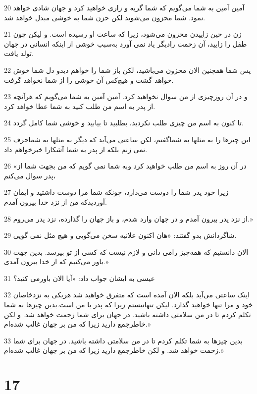 \par 20 آمین آمین به شما می‌گویم که شما گریه و زاری خواهید کرد و جهان شادی خواهد نمود. شما محزون می‌شوید لکن حزن شما به خوشی مبدل خواهد شد.
\par 21 زن در حین زاییدن محزون می‌شود، زیرا که ساعت او رسیده است. و لیکن چون طفل را زایید، آن زحمت رادیگر یاد نمی آورد به‌سبب خوشی از اینکه انسانی در جهان تولد یافت.
\par 22 پس شما همچنین الان محزون می‌باشید، لکن باز شما را خواهم دیدو دل شما خوش خواهد گشت و هیچ‌کس آن خوشی را از شما نخواهد گرفت.
\par 23 و در آن روزچیزی از من سوال نخواهید کرد. آمین آمین به شما می‌گویم که هر‌آنچه از پدر به اسم من طلب کنید به شما عطا خواهد کرد.
\par 24 تا کنون به اسم من چیزی طلب نکردید، بطلبید تا بیابید و خوشی شما کامل گردد.
\par 25 این چیزها را به مثلها به شماگفتم، لکن ساعتی می‌آید که دیگر به مثلها به شماحرف نمی زنم بلکه از پدر به شما آشکارا خبرخواهم داد.
\par 26 «در آن روز به اسم من طلب خواهید کرد وبه شما نمی گویم که من بجهت شما از پدر سوال می‌کنم،
\par 27 زیرا خود پدر شما را دوست می‌دارد، چونکه شما مرا دوست داشتید و ایمان آوردیدکه من از نزد خدا بیرون آمدم.
\par 28 از نزد پدر بیرون آمدم و در جهان وارد شدم، و باز جهان را گذارده، نزد پدر می‌روم.»
\par 29 شاگردانش بدو گفتند: «هان اکنون علانیه سخن می‌گویی و هیچ مثل نمی گویی.
\par 30 الان دانستیم که همه‌چیز رامی دانی و لازم نیست که کسی از تو بپرسد. بدین جهت باور می‌کنیم که از خدا بیرون آمدی.»
\par 31 عیسی به ایشان جواب داد: «آیا الان باورمی کنید؟
\par 32 اینک ساعتی می‌آید بلکه الان آمده است که متفرق خواهید شد هریکی به نزدخاصان خود و مرا تنها خواهید گذارد. لیکن تنهانیستم زیرا که پدر با من است.بدین چیزها به شما تکلم کردم تا در من سلامتی داشته باشید. در جهان برای شما زحمت خواهد شد. و لکن خاطرجمع دارید زیرا که من بر جهان غالب شده‌ام.»
\par 33 بدین چیزها به شما تکلم کردم تا در من سلامتی داشته باشید. در جهان برای شما زحمت خواهد شد. و لکن خاطرجمع دارید زیرا که من بر جهان غالب شده‌ام.»

\chapter{17}

